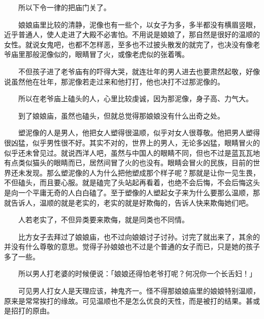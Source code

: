 \documentclass[UTF8]{ctexart}
\begin{document}
　　所以下令一律的把庙门关了。

　　娘娘庙里比较的清静，泥像也有一些个，以女子为多，多半都没有横眉竖眼，近乎普通人，使人走进了大殿不必害怕。不用说是娘娘了，那自然是很好的温顺的女性。就说女鬼吧，也都不怎样恶，至多也不过披头散发的就完了，也决没有像老爷庙里那般泥像似的，眼睛冒了火，或像老虎似的张着嘴。

　　不但孩子进了老爷庙有的吓得大哭，就连壮年的男人进去也要肃然起敬，好像说虽然他在壮年，那泥像若走过来和他打打，他也决打不过那泥像的。

　　所以在老爷庙上磕头的人，心里比较虔诚，因为那泥像，身子高、力气大。

　　到了娘娘庙，虽然也磕头，但就总觉得那娘娘没有什么出奇之处。

　　塑泥像的人是男人，他把女人塑得很温顺，似乎对女人很尊敬。他把男人塑得很凶猛，似乎男性很不好。其实不对的，世界上的男人，无论多凶猛，眼睛冒火的似乎还未曾见过。就说西洋人吧，虽然与中国人的眼睛不同，但也不过是蓝瓦瓦地有点类似猫头的眼睛而已，居然间冒了火的也没有。眼睛会冒火的民族，目前的世界还未发现。那么塑泥像的人为什么把他塑成那个样子呢？那就是让你一见生畏，不但磕头，而且要心服。就是磕完了头站起再看着，也绝不会后悔，不会后悔这头是向一个平庸无奇的人白白磕了。至于塑像的人塑起女子来为什么要那么温顺，那就告诉人，温顺的就是老实的，老实的就是好欺侮的，告诉人快来欺侮她们吧。

　　人若老实了，不但异类要来欺侮，就是同类也不同情。

　　比方女子去拜过了娘娘庙，也不过向娘娘讨子讨孙。讨完了就出来了，其余的并没有什么尊敬的意思。觉得子孙娘娘也不过是个普通的女子而已，只是她的孩子多了一些。

　　所以男人打老婆的时候便说：「娘娘还得怕老爷打呢？何况你一个长舌妇！」

　　可见男人打女人是天理应该，神鬼齐一。怪不得那娘娘庙里的娘娘特别温顺，原来是常常挨打的缘故。可见温顺也不是怎么优良的天性，而是被打的结果。甚或是招打的原由。
\end{document}
